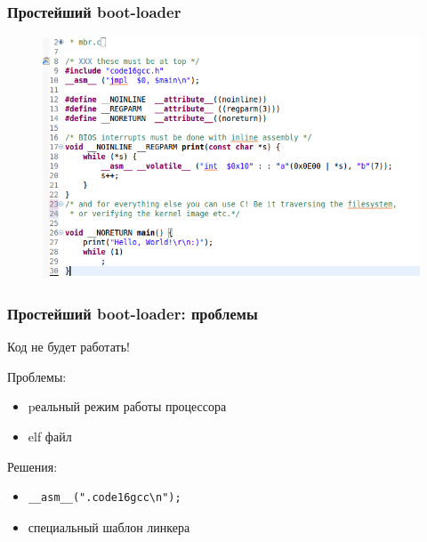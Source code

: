 \documentclass{beamer}
\begin{document}
\begin{frame}
\frametitle{Простейший boot-loader}

\begin{figure}
\includegraphics[scale=0.5]{res/mbr}
\end{figure}

\end{frame}


\begin{frame}[fragile]
\frametitle{Простейший boot-loader: проблемы}
Код не будет работать!
\vspace{3em}
\pause

Проблемы:
\begin{itemize}
\item pеальный режим работы процессора
\item elf файл
\end{itemize}
\vspace{3em}
\pause

Решения:
\begin{itemize}
\item \begin{verbatim}__asm__(".code16gcc\n");\end{verbatim}
\item специальный шаблон линкера
\end{itemize}

\end{frame}

\end{document}
